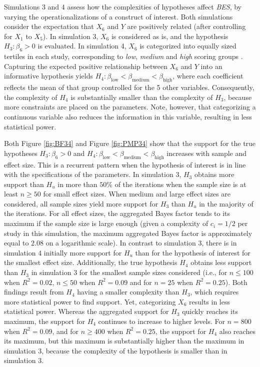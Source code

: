\documentclass[review, 3p, authoryear]{elsarticle} %
\begin{document}
Simulations 3 and 4 assess how the complexities of hypotheses affect \emph{BES}, by varying the operationalizations of a construct of interest.
Both simulations consider the expectation that \(X_6\) and \(Y\) are positively related (after controlling for \(X_1\) to \(X_5\)).
In simulation 3, \(X_6\) is considered as is, and the hypothesis \(H_3: \beta_6 > 0\) is evaluated.
In simulation 4, \(X_6\) is categorized into equally sized tertiles in each study, corresponding to \emph{low}, \emph{medium} and \emph{high} scoring groups \citep[which is, despite advice against it, a common procedure in many areas of research; e.g.,][]{bennette_against_2012, decoster_best_2011}.
Capturing the expected positive relationship between \(X_6\) and \(Y\) into an informative hypothesis yields \(H_4: \beta_{\text{low}} < \beta_{\text{medium}} < \beta_{\text{high}}\), where each coefficient reflects the mean of that group controlled for the 5 other variables.
Consequently, the complexity of \(H_4\) is substantially smaller than the complexity of \(H_3\), because more constraints are placed on the parameters.
Note, however, that categorizing a continuous variable also reduces the information in this variable, resulting in less statistical power.

Both Figure \ref{fig:BF34} and Figure \ref{fig:PMP34} show that the support for the true hypotheses \(H_3:\beta_6>0\) and \(H_4: \beta_{\text{low}} < \beta_{\text{medium}} < \beta_{\text{high}}\) increases with sample and effect size.
This is a recurrent pattern when the hypothesis of interest is in line with the specifications of the parameters.
In simulation 3, \(H_3\) obtains more support than \(H_u\) in more than \(50\%\) of the iterations when the sample size is at least \(n \geq 50\) for small effect sizes.
When medium and large effect sizes are considered, all sample sizes yield more support for \(H_3\) than \(H_u\) in the majority of the iterations.
For all effect sizes, the aggregated Bayes factor tends to its maximum if the sample size is large enough (given a complexity of \(c_i = 1/2\) per study in this simulation, the maximum aggregated Bayes factor is approximately equal to \(2.08\) on a logarithmic scale).
In contrast to simulation 3, there is in simulation 4 initially more support for \(H_u\) than for the hypothesis of interest for the smallest effect size.
Additionally, the true hypothesis \(H_4\) obtains less support than \(H_3\) in simulation 3 for the smallest sample sizes considered (i.e., for \(n \leq 100\) when \(R^2 = 0.02\), \(n \leq 50\) when \(R^2 = 0.09\) and for \(n = 25\) when \(R^2 = 0.25\)).
Both findings result from \(H_4\) having a smaller complexity than \(H_3\), which requires more statistical power to find support.
Yet, categorizing \(X_6\) results in less statistical power.
Whereas the aggregated support for \(H_3\) quickly reaches its maximum, the support for \(H_4\) continues to increase to higher levels.
For \(n = 800\) when \(R^2 = 0.09\), and for \(n \geq 400\) when \(R^2 = 0.25\), the support for \(H_4\) also reaches its maximum, but this maximum is substantially higher than the maximum in simulation 3, because the complexity of the hypothesis is smaller than in simulation 3.
\end{document}
